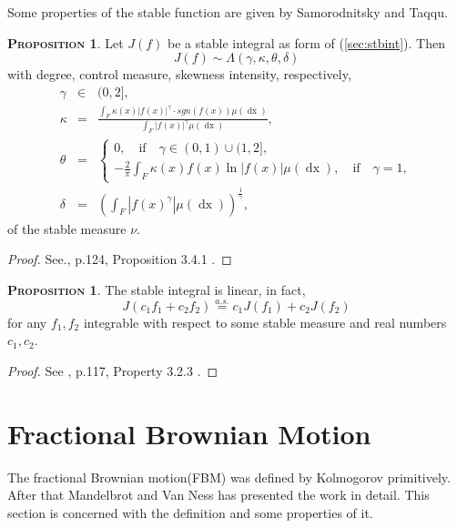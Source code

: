 \documentclass[a4paper, twoside, 11pt]{article}
\theoremstyle{definition}
\newtheorem{proposition}[definition]{\scshape Proposition}
\newcommand{\brkt}[1]{\left({#1} \right)}
\begin{document}
Some properties of the stable function are given by Samorodnitsky and Taqqu.

\begin{proposition}
  Let $J(f)$ be a stable integral as form of (\ref{sec:stbint}). Then 
  \begin{equation*}
	J(f) \sim \Lambda(\gamma, \kappa, \theta, \delta)
  \end{equation*}
with degree, control measure, skewness intensity, respectively, 
\begin{eqnarray*}
\gamma &\in& (0, 2],\\
\kappa &=& \frac{\int_F \kappa(x) |f(x)|^\gamma\cdot sgn(f(x)) \mu(\mathop{dx})}{\int_F|f(x)|^\gamma\mu(\mathop{dx})},\\
\theta &=&
\begin{cases}
0 , \hspace{1em} \text{if} \hspace{1em} \gamma \in (0, 1) \cup (1, 2],\\
  -\frac{2}{\pi}\int_F \kappa(x) f(x) \ln|f(x)|\mu(\mathop{dx}), \hspace{1em} \text{if} \hspace{1em} \gamma = 1,
\end{cases}\\
\delta &=& \brkt{\int_F |f(x)^\gamma|\mu(\mathop{dx})}^{\frac{1}{\gamma}}, 
\end{eqnarray*}
of the stable measure $\nu$.
\label{sec:stbint2}
\end{proposition}
\begin{proof}
  See.\cite{samorodnitsky}, p.124, Proposition 3.4.1 .
\end{proof}
\begin{proposition}
  The stable integral is linear, in fact,
\begin{equation}
  J(c_1f_1 + c_2f_2) \overset{a.s.}{=}c_1J(f_1) + c_2J(f_2)
  \label{sec:stblin}
\end{equation}
for any $f_1, f_2$ integrable with respect to some stable measure and real numbers $c_1, c_2$. 
\end{proposition}
\begin{proof}
  See \cite{samorodnitsky}, p.117, Property 3.2.3 .
\end{proof}
\newpage
\section{Fractional Brownian Motion}
\setcounter{equation}{0}
The fractional Brownian motion(FBM) was defined by Kolmogorov primitively. After that Mandelbrot and Van Ness has presented the work in detail. This section is concerned with the definition and some properties of it.
\end{document}
